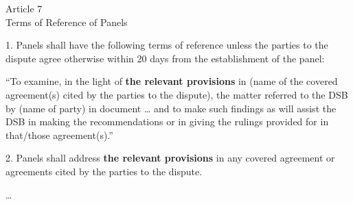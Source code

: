 \begin{displayquote}[][]
  \begin{center}
    Article 7\\
    Terms of Reference of Panels
  \end{center}

  1. Panels shall have the following terms of reference unless the parties to the dispute
  agree otherwise within 20 days from the establishment of the panel:

  \begin{displayquote}[][]

    ``To examine, in the light of {\bf the relevant provisions} in (name of the covered
    agreement(s) cited by the parties to the dispute), the matter referred to the DSB by
    (name of party) in document … and to make such findings as will assist the DSB in
    making the recommendations or in giving the rulings provided for in that/those
    agreement(s).''
      
  \end{displayquote}

  2. Panels shall address {\bf the relevant provisions} in any covered agreement or agreements
  cited by the parties to the dispute.

  \ldots
\end{displayquote}
